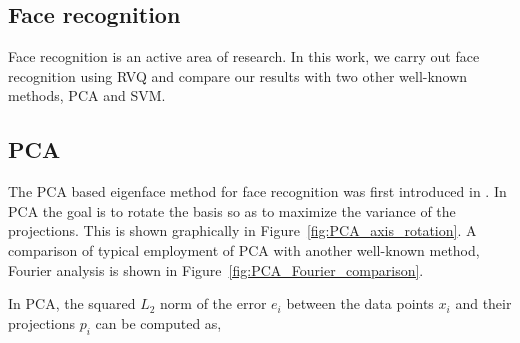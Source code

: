 \begin{Body}
%
%
%
%



\section{Face recognition}
Face recognition is an active area of research.  In this work, we carry out face recognition using RVQ and compare our results with two other well-known methods, PCA and SVM.  

\subsection{PCA}
The PCA based eigenface method for face recognition was first introduced in \cite{1991_JNL_Eigenfaces_Turk}.  In PCA the goal is to rotate the basis so as to maximize the variance of the projections.  This is shown graphically in Figure~\ref{fig:PCA_axis_rotation}.  A comparison of typical employment of PCA with another well-known method, Fourier analysis is shown in Figure~\ref{fig:PCA_Fourier_comparison}.



In PCA, the squared $L_2$ norm of the error $e_i$ between the data points $x_i$ and their projections $p_i$ can be computed as,


\end{Body}
